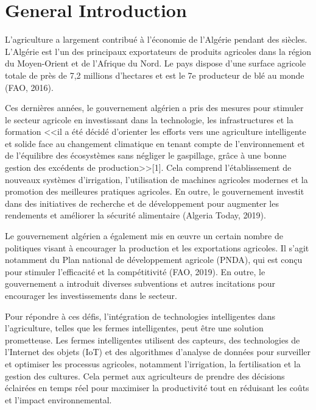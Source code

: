 \chapter*{General Introduction} 
\label{chap:introduction} 

L'agriculture a largement contribué à l'économie de l'Algérie pendant des siècles. L'Algérie est l'un des principaux exportateurs de produits agricoles dans la région du Moyen-Orient et de l'Afrique du Nord. Le pays dispose d'une surface agricole totale de près de 7,2 millions d'hectares et est le 7e producteur de blé au monde (FAO, 2016).

Ces dernières années, le gouvernement algérien a pris des mesures pour stimuler le secteur agricole en investissant dans la technologie, les infrastructures et la formation <<il a été décidé d’orienter les efforts vers une agriculture intelligente et solide face au changement climatique en tenant compte de l’environnement et de l’équilibre des écosystèmes sans négliger le gaspillage, grâce à une bonne gestion des excédents de production>>[1]. Cela comprend l'établissement de nouveaux systèmes d'irrigation, l'utilisation de machines agricoles modernes et la promotion des meilleures pratiques agricoles. En outre, le gouvernement investit dans des initiatives de recherche et de développement pour augmenter les rendements et améliorer la sécurité alimentaire (Algeria Today, 2019).

Le gouvernement algérien a également mis en œuvre un certain nombre de politiques visant à encourager la production et les exportations agricoles. Il s'agit notamment du Plan national de développement agricole (PNDA), qui est conçu pour stimuler l'efficacité et la compétitivité (FAO, 2019). En outre, le gouvernement a introduit diverses subventions et autres incitations pour encourager les investissements dans le secteur.


Pour répondre à ces défis, l'intégration de technologies intelligentes dans l'agriculture, telles que les fermes intelligentes, peut être une solution prometteuse. Les fermes intelligentes utilisent des capteurs, des technologies de l'Internet des objets (IoT) et des algorithmes d'analyse de données pour surveiller et optimiser les processus agricoles, notamment l'irrigation, la fertilisation et la gestion des cultures. Cela permet aux agriculteurs de prendre des décisions éclairées en temps réel pour maximiser la productivité tout en réduisant les coûts et l'impact environnemental.



